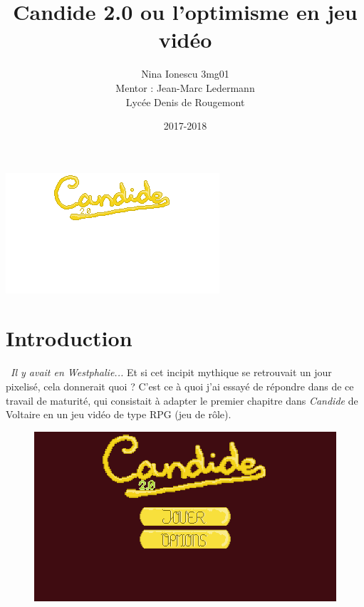 \documentclass[11pt]{article}
\begin{document}
\renewcommand{\appendixtocname}{Annexes}
\renewcommand{\appendixpagename}{Annexes}
\renewcommand{\refname}{Sources}



\title{Candide 2.0 ou l'optimisme en jeu vidéo }
\author{Nina Ionescu 3mg01 \\ Mentor : Jean-Marc Ledermann \\ Lycée Denis de Rougemont}
\date{2017-2018}
\maketitle
\includegraphics{title}
\newpage
\tableofcontents
\newpage
{}
\section{Introduction}\
\textit {Il y avait en Westphalie...} Et si cet incipit mythique se retrouvait un jour pixelisé, cela donnerait quoi ? C'est ce à quoi j'ai essayé de répondre dans de ce travail de maturité, qui consistait à adapter le premier chapitre dans \textit{Candide} de Voltaire en un jeu vidéo de type RPG (jeu de rôle).
\begin{figure}[h]
\includegraphics[scale=0.33]{ecranTitre}
\centering
\end{figure}
\end{document}
